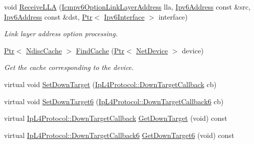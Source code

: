 \begin{DoxyCompactItemize}
void \hyperlink{classns3_1_1Icmpv6L4Protocol_ad6670739eba9c44ba37bf9644bfcdde5}{Receive\+L\+LA} (\hyperlink{classns3_1_1Icmpv6OptionLinkLayerAddress}{Icmpv6\+Option\+Link\+Layer\+Address} lla, \hyperlink{classns3_1_1Ipv6Address}{Ipv6\+Address} const \&src, \hyperlink{classns3_1_1Ipv6Address}{Ipv6\+Address} const \&dst, \hyperlink{classns3_1_1Ptr}{Ptr}$<$ \hyperlink{classns3_1_1Ipv6Interface}{Ipv6\+Interface} $>$ interface)
\begin{DoxyCompactList}\small\item\em Link layer address option processing. \end{DoxyCompactList}\item 
\hyperlink{classns3_1_1Ptr}{Ptr}$<$ \hyperlink{classns3_1_1NdiscCache}{Ndisc\+Cache} $>$ \hyperlink{classns3_1_1Icmpv6L4Protocol_a90167126423f3957718e22a8bcd325c8}{Find\+Cache} (\hyperlink{classns3_1_1Ptr}{Ptr}$<$ \hyperlink{classns3_1_1NetDevice}{Net\+Device} $>$ device)
\begin{DoxyCompactList}\small\item\em Get the cache corresponding to the device. \end{DoxyCompactList}\item 
virtual void \hyperlink{classns3_1_1Icmpv6L4Protocol_a00e5888c45d07ad5a35b98995b813f23}{Set\+Down\+Target} (\hyperlink{classns3_1_1IpL4Protocol_ae3ba76c0a48fbaa90529c528a15f12b6}{Ip\+L4\+Protocol\+::\+Down\+Target\+Callback} cb)
\item 
virtual void \hyperlink{classns3_1_1Icmpv6L4Protocol_aa0f5416435059e873d216ffc07928f23}{Set\+Down\+Target6} (\hyperlink{classns3_1_1IpL4Protocol_a039f3d1883632ab922fa958fc9ecd97f}{Ip\+L4\+Protocol\+::\+Down\+Target\+Callback6} cb)
\item 
virtual \hyperlink{classns3_1_1IpL4Protocol_ae3ba76c0a48fbaa90529c528a15f12b6}{Ip\+L4\+Protocol\+::\+Down\+Target\+Callback} \hyperlink{classns3_1_1Icmpv6L4Protocol_a896e8109bbc5441c6aceb0c7e7a76549}{Get\+Down\+Target} (void) const 
\item 
virtual \hyperlink{classns3_1_1IpL4Protocol_a039f3d1883632ab922fa958fc9ecd97f}{Ip\+L4\+Protocol\+::\+Down\+Target\+Callback6} \hyperlink{classns3_1_1Icmpv6L4Protocol_a192cbd6ca4abe12cb15ea46856d85bb7}{Get\+Down\+Target6} (void) const 
\end{DoxyCompactItemize}
